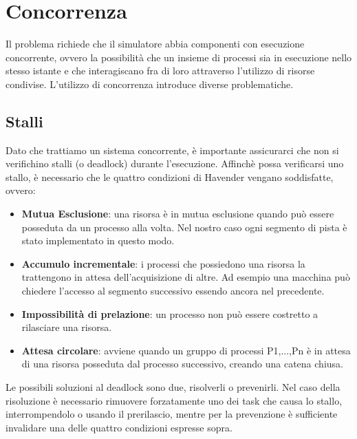 \section{Concorrenza}
Il problema richiede che il simulatore abbia componenti con esecuzione concorrente, ovvero la possibilità che un insieme di processi sia in esecuzione nello stesso istante e che interagiscano fra di loro attraverso l'utilizzo di risorse condivise. L'utilizzo di concorrenza introduce diverse problematiche.
 \subsection{Stalli}
 Dato che trattiamo un sistema concorrente, è importante assicurarci che non si verifichino stalli (o deadlock) durante l’esecuzione.
Affinchè possa verificarsi uno stallo, è necessario che le quattro condizioni di Havender vengano soddisfatte, ovvero:
\begin{itemize}
 \item \textbf{Mutua Esclusione}: una risorsa è in mutua esclusione quando può essere posseduta da un processo alla volta. Nel nostro caso ogni segmento di pista è stato implementato in questo modo.
 \item \textbf{Accumulo incrementale}: i processi che possiedono una risorsa la trattengono in attesa dell’acquisizione di altre. Ad esempio una macchina può chiedere l’accesso al segmento successivo essendo ancora nel precedente.
 \item \textbf{Impossibilità di prelazione}: un processo non può essere costretto a rilasciare una risorsa.
 \item \textbf{Attesa circolare}: avviene quando un gruppo di processi P1,...,Pn è in attesa di una risorsa posseduta dal processo successivo, creando una catena chiusa.
\end{itemize}
Le possibili soluzioni al deadlock sono due, risolverli o prevenirli. Nel caso della risoluzione è necessario rimuovere forzatamente uno dei task che causa lo stallo, interrompendolo o usando il prerilascio, mentre per la prevenzione è sufficiente invalidare una delle quattro condizioni espresse sopra.

